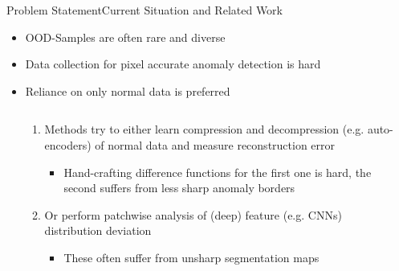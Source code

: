 \begin{frame}{Problem Statement}{Current Situation and Related Work}
    \begin{itemize}
        \item<1-> OOD-Samples are often rare and diverse
        \item<2-> Data collection for pixel accurate anomaly detection is hard
        \item<3-> Reliance on only normal data is preferred
        \begin{columns}
            \begin{column}{0.4\textwidth}
                \begin{enumerate}
                    \item<4-> Methods try to either learn compression and decompression (e.g. auto-encoders) of normal data and measure reconstruction error
                    \begin{itemize}
                        \item<5-> Hand-crafting difference functions for the first one is hard, the second suffers from less sharp anomaly borders
                    \end{itemize}
                    \item<6-> Or perform patchwise analysis of (deep) feature (e.g. CNNs) distribution deviation
                    \begin{itemize}
                        \item<7-> These often suffer from unsharp segmentation maps
                    \end{itemize}
                \end{enumerate}
            \end{column}
                \begin{column}{0.6\textwidth}
\end{column}
\end{columns}
\end{itemize}
\end{frame}
